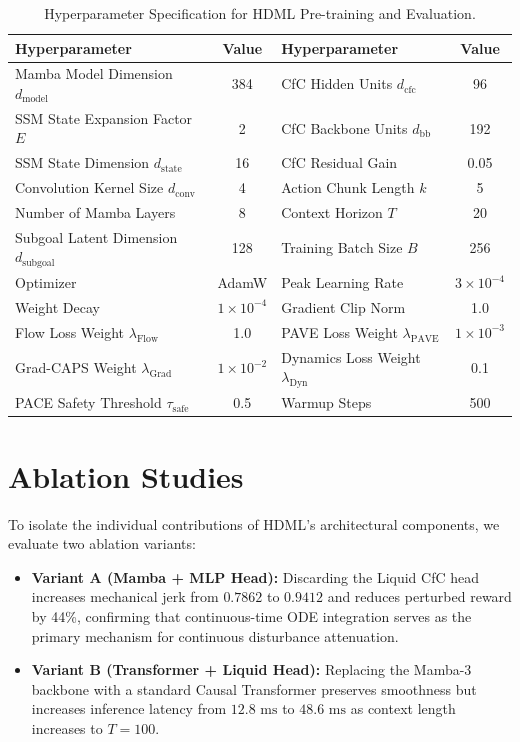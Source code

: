 \documentclass{article}
\begin{document}
\begin{table}[h]
\centering
\caption{Hyperparameter Specification for HDML Pre-training and Evaluation.}
\label{tab:hyperparameters}
\small
\begin{tabular}{lc|lc}
\toprule
\textbf{Hyperparameter} & \textbf{Value} & \textbf{Hyperparameter} & \textbf{Value} \\
\midrule
Mamba Model Dimension $d_{\text{model}}$ & 384 & CfC Hidden Units $d_{\text{cfc}}$ & 96 \\
SSM State Expansion Factor $E$ & 2 & CfC Backbone Units $d_{\text{bb}}$ & 192 \\
SSM State Dimension $d_{\text{state}}$ & 16 & CfC Residual Gain & 0.05 \\
Convolution Kernel Size $d_{\text{conv}}$ & 4 & Action Chunk Length $k$ & 5 \\
Number of Mamba Layers & 8 & Context Horizon $T$ & 20 \\
Subgoal Latent Dimension $d_{\text{subgoal}}$ & 128 & Training Batch Size $B$ & 256 \\
Optimizer & AdamW & Peak Learning Rate & $3 \times 10^{-4}$ \\
Weight Decay & $1 \times 10^{-4}$ & Gradient Clip Norm & 1.0 \\
Flow Loss Weight $\lambda_{\text{Flow}}$ & 1.0 & PAVE Loss Weight $\lambda_{\text{PAVE}}$ & $1 \times 10^{-3}$ \\
Grad-CAPS Weight $\lambda_{\text{Grad}}$ & $1 \times 10^{-2}$ & Dynamics Loss Weight $\lambda_{\text{Dyn}}$ & 0.1 \\
PACE Safety Threshold $\tau_{\text{safe}}$ & 0.5 & Warmup Steps & 500 \\
\bottomrule
\end{tabular}
\end{table}

\section{Ablation Studies}
\label{sec:ablations}

To isolate the individual contributions of HDML's architectural components, we evaluate two ablation variants:
\begin{itemize}
    \item \textbf{Variant A (Mamba + MLP Head):} Discarding the Liquid CfC head increases mechanical jerk from $0.7862$ to $0.9412$ and reduces perturbed reward by 44\%, confirming that continuous-time ODE integration serves as the primary mechanism for continuous disturbance attenuation.
    \item \textbf{Variant B (Transformer + Liquid Head):} Replacing the Mamba-3 backbone with a standard Causal Transformer preserves smoothness but increases inference latency from $12.8\text{ ms}$ to $48.6\text{ ms}$ as context length increases to $T=100$.
\end{itemize}
\end{document}
